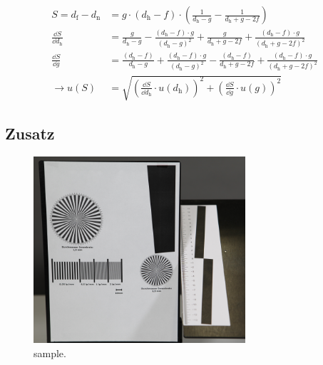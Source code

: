 \begin{description}
		\begin{align}
			S = d_\text{f} - d_\text{n} &= g\cdot (d_\text{h}-f) \cdot \left( \frac{1}{d_\text{h} - g} - \frac{1}{d_\text{h} + g -2f} \right) \\
			\frac{\dd S}{\dd d_\text{h}} &= \frac{g}{d_\text{h} - g} - \frac{(d_\text{h} - f)\cdot g}{(d_\text{h} - g)^2} + \frac{g}{d_\text{h} + g - 2f} + \frac{(d_\text{h} - f)\cdot g}{(d_\text{h} + g - 2f)^2} \\
			\frac{\dd S}{\dd g} &= \frac{(d_\text{h} - f)}{d_\text{h} - g} + \frac{(d_\text{h} - f)\cdot g}{(d_\text{h} - g)^2} - \frac{(d_\text{h} - f)}{d_\text{h} + g - 2f} + \frac{(d_\text{h} - f)\cdot g}{(d_\text{h} + g - 2f)^2} \\
			\rightarrow u(S) &= \sqrt{\left( \frac{\dd S}{\dd d_\text{h}} \cdot u(d_\text{h}) \right)^2 + \left( \frac{\dd S}{\dd g} \cdot u(g) \right)^2 }
		\end{align}	
		
	\end{description}

\subsection{Zusatz}\label{subsec:Zusatz}

\begin{figure}[ht]
	\centering
	\includegraphics[width=0.7\textwidth]{bilder/testbild.png}
	\caption{sample.\cite{WWU}}
	\label{fig:testbild}	
\end{figure}	